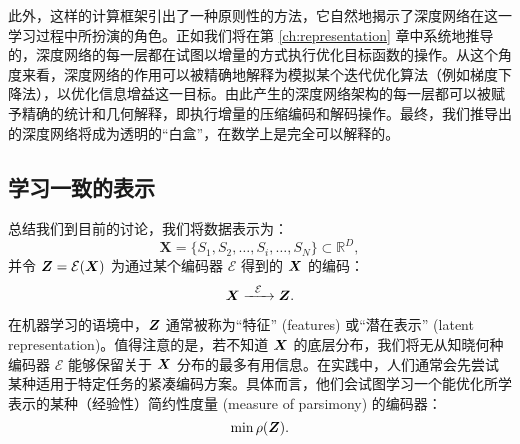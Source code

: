 \documentclass[../../book-main.tex]{subfiles}
\begin{document}
此外，这样的计算框架引出了一种原则性的方法，它自然地揭示了深度网络在这一学习过程中所扮演的角色。正如我们将在第 \ref{ch:representation} 章中系统地推导的，深度网络的每一层都在试图以增量的方式执行优化目标函数的操作。从这个角度来看，深度网络的作用可以被精确地解释为模拟某个迭代优化算法（例如梯度下降法），以优化信息增益这一目标。由此产生的深度网络架构的每一层都可以被赋予精确的统计和几何解释，即执行增量的压缩编码和解码操作。最终，我们推导出的深度网络将成为透明的“白盒”，在数学上是完全可以解释的。











\subsection{学习一致的表示}

\label{sec:consistency}
总结我们到目前的讨论，我们将数据表示为：
\begin{equation}
    \boldsymbol{X} = \{S_1, S_2, \ldots, S_i, \ldots, S_N\} \subset \mathbb{R}^D,
\end{equation}
并令 $\boldsymbol{Z} = \mathcal{E}(\bm{X})$ 为通过某个编码器 $\mathcal{E}$ 得到的 $\bm{X}$ 的编码：
\begin{equation}
    \bm{X}  \xrightarrow{\hspace{2mm} \mathcal{E}\hspace{2mm}} \bm{Z}.
    \label{eqn:open-loop}
\end{equation}

在机器学习的语境中，$\bm{Z}$ 通常被称为“特征” (features) 或“潜在表示” (latent representation)。值得注意的是，若不知道 $\bm{X}$ 的底层分布，我们将无从知晓何种编码器 $\mathcal{E}$ 能够保留关于 $\bm{X}$ 分布的最多有用信息。在实践中，人们通常会先尝试某种适用于特定任务的紧凑编码方案。具体而言，他们会试图学习一个能优化所学表示的某种（经验性）简约性度量 (measure of parsimony) 的编码器：
\begin{equation}
    \min \rho(\bm{Z}). 
\end{equation}
\end{document}

